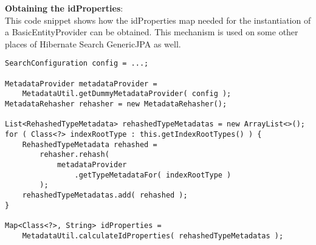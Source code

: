 \noindent
\textbf{Obtaining the idProperties}:\\
This code snippet shows how the idProperties map needed for the instantiation of a BasicEntityProvider can be obtained. This mechanism is used on some other places of Hibernate Search GenericJPA as well.
\\
\lstset{language=java}
\begin{lstlisting}[frame=htrbl, caption={Obtaining idProperties}, label={lst:idProperties.java}]
SearchConfiguration config = ...;

MetadataProvider metadataProvider = 
	MetadataUtil.getDummyMetadataProvider( config );
MetadataRehasher rehasher = new MetadataRehasher();

List<RehashedTypeMetadata> rehashedTypeMetadatas = new ArrayList<>();
for ( Class<?> indexRootType : this.getIndexRootTypes() ) {
	RehashedTypeMetadata rehashed = 
		rehasher.rehash( 
			metadataProvider
				.getTypeMetadataFor( indexRootType ) 
		);
	rehashedTypeMetadatas.add( rehashed );
}

Map<Class<?>, String> idProperties = 
	MetadataUtil.calculateIdProperties( rehashedTypeMetadatas );
\end{lstlisting}

\pagebreak

